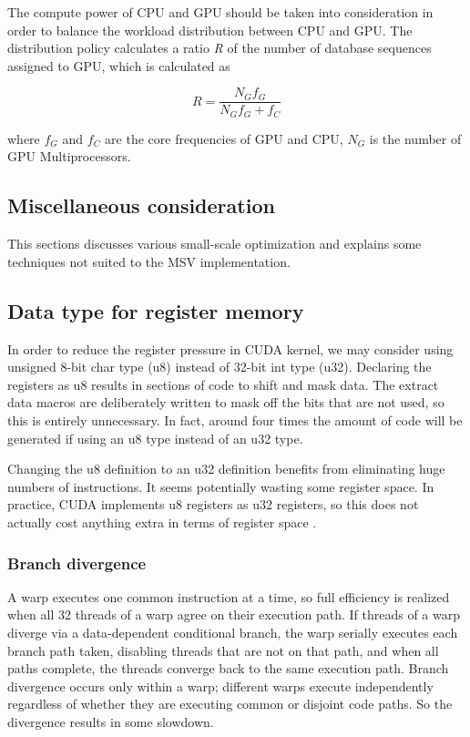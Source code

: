 The compute power of CPU and GPU should be taken into consideration in order to balance the workload distribution between CPU and GPU. The distribution policy calculates a ratio \emph{R} of the number of database sequences assigned to GPU, which is calculated as

\begin{equation*}
   R = \frac{N_Gf_G}{N_Gf_G + f_C}
\end{equation*}

where $f_G$ and $f_C$ are the core frequencies of GPU and CPU, $N_G$ is the number of GPU Multiprocessors.


\subsection{Miscellaneous consideration}
This sections discusses various small-scale optimization and explains some techniques not suited to the MSV implementation.

\subsection*{Data type for register memory}
\label{register}
In order to reduce the register pressure in CUDA kernel, we may consider using unsigned 8-bit char type (u8) instead of 32-bit int type (u32). Declaring the registers as u8 results in sections of code to shift and mask data. The extract data macros are deliberately written to mask off the bits that are not used, so this is entirely unnecessary. In fact, around four times the amount of code will be generated if using an u8 type instead of an u32 type.

Changing the u8 definition to an u32 definition benefits from eliminating huge numbers of instructions. It seems potentially wasting some register space. In practice, CUDA implements u8 registers as u32 registers, so this does not actually cost anything extra in terms of register space \citep{cook}.

\subsubsection*{Branch divergence}
\label{branch}

A warp executes one common instruction at a time, so full efficiency is realized when all 32 threads of a warp agree on their execution path. If threads of a warp diverge via a data-dependent conditional branch, the warp serially executes each branch path taken, disabling threads that are not on that path, and when all paths complete, the threads converge back to the same execution path. Branch divergence occurs only within a warp; different warps execute independently regardless of whether they are executing common or disjoint code paths. So the divergence results in some slowdown.

